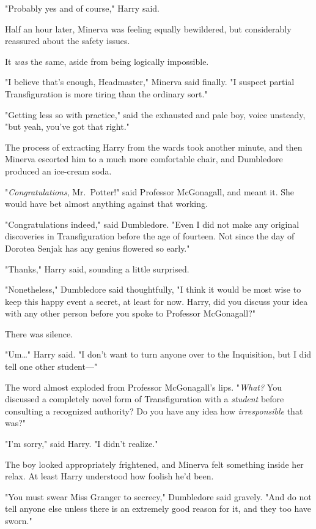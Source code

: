 "Probably yes and of course," Harry said.

Half an hour later, Minerva was feeling equally bewildered, but considerably 
reassured about the safety issues.

It \emph{was} the same, aside from being logically impossible.

"I believe that's enough, Headmaster," Minerva said finally. "I suspect partial 
Transfiguration is more tiring than the ordinary sort."

"Getting less so with practice," said the exhausted and pale boy, voice 
unsteady, "but yeah, you've got that right."

The process of extracting Harry from the wards took another minute, and then 
Minerva escorted him to a much more comfortable chair, and Dumbledore produced 
an ice-cream soda.

"\emph{Congratulations}, Mr.~Potter!" said Professor McGonagall, and meant it. 
She would have bet almost anything against that working.

"Congratulations indeed," said Dumbledore. "Even I did not make any original 
discoveries in Transfiguration before the age of fourteen. Not since the day of 
Dorotea Senjak has any genius flowered so early."

"Thanks," Harry said, sounding a little surprised.

"Nonetheless," Dumbledore said thoughtfully, "I think it would be most wise to 
keep this happy event a secret, at least for now. Harry, did you discuss your 
idea with any other person before you spoke to Professor McGonagall?"

There was silence.

"Um{\ldots}" Harry said. "I don't want to turn anyone over to the Inquisition, 
but I did tell one other student---"

The word almost exploded from Professor McGonagall's lips. "\emph{What?} You 
discussed a completely novel form of Transfiguration with a \emph{student} 
before consulting a recognized authority? Do you have any idea how 
\emph{irresponsible} that was?"

"I'm sorry," said Harry. "I didn't realize."

The boy looked appropriately frightened, and Minerva felt something inside her 
relax. At least Harry understood how foolish he'd been.

"You must swear Miss Granger to secrecy," Dumbledore said gravely. "And do not 
tell anyone else unless there is an extremely good reason for it, and they too 
have sworn."

